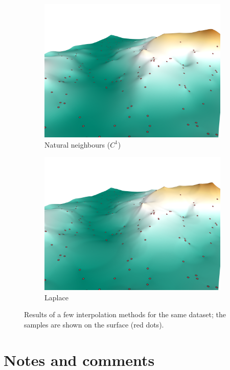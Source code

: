 \begin{figure}
\begin{subfigure}[b]{0.41\linewidth}
    \includegraphics{figs/results/nni_c1.png}
    \caption{Natural neighbours ($C^1$)}
  \end{subfigure}  
  \quad
  \begin{subfigure}[b]{0.41\linewidth}
    \centering
    \includegraphics{figs/results/laplace.png}
    \caption{Laplace}
  \end{subfigure}  
\caption{Results of a few interpolation methods for the same dataset; the samples are shown on the surface (red dots).}%
\end{figure}



%
\section{Notes and comments}


